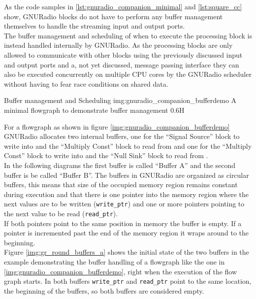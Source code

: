 As the code samples in \autoref{lst:gnuradio_companion_minimal}
and \autoref{lst:square_cc} show, GNURadio blocks do not have to
perform any buffer management themselves to handle the streaming
input and output ports. \\

The buffer management and scheduling of when to execute the processing
block is instead handled internally by GNURadio.
As the processing blocks are only allowed to communicate with
other blocks using the previously discussed input and output ports
and a, not yet discussed, message passing interface they can also
be executed concurrently on multiple CPU cores by the GNURadio scheduler
without having to fear race conditions on shared data. \\

\begin{subchapter}{Buffer management and Scheduling}
               {img:gnuradio_companion_bufferdemo}
               {A minimal flowgraph to demonstrate buffer management}
               {0.6}{H}

  For a flowgraph as shown in figure \ref{img:gnuradio_companion_bufferdemo}
  GNURadio  allocates two internal buffers, one for the ``Signal Source'' block
  to write into and the ``Multiply Const'' block to read from and one for the
  ``Multiply Const'' block to write into and the ``Null Sink'' block to
  read from \cite{grblogbuffers}. \\

  In the following diagrams the first buffer is called ``Buffer A''
  and the second buffer is be called ``Buffer B''.
  The buffers in GNURadio are organized as circular buffers, this means
  that size of the occupied memory region remains constant during execution
  and that there is one pointer into the memory region where the next
  values are to be written (\texttt{write\_ptr}) and one or more
  pointers pointing to the next value to be read (\texttt{read\_ptr}). \\

  If both pointers point to the same position in memory the buffer is empty.
  If a pointer is incremented past the end of the memory region
  it wraps around to the beginning. \\

  Figure \ref{img:gr_round_buffers_a} shows the initial state of the
  two buffers in the example demonstrating the buffer handling
  of a flowgraph like the one in \autoref{img:gnuradio_companion_bufferdemo},
  right when the execution of the flow graph starts.
  In both buffers \texttt{write\_ptr} and \texttt{read\_ptr}
  point to the same location, the beginning of the buffers,
  so both buffers are considered empty.


\end{subchapter}
